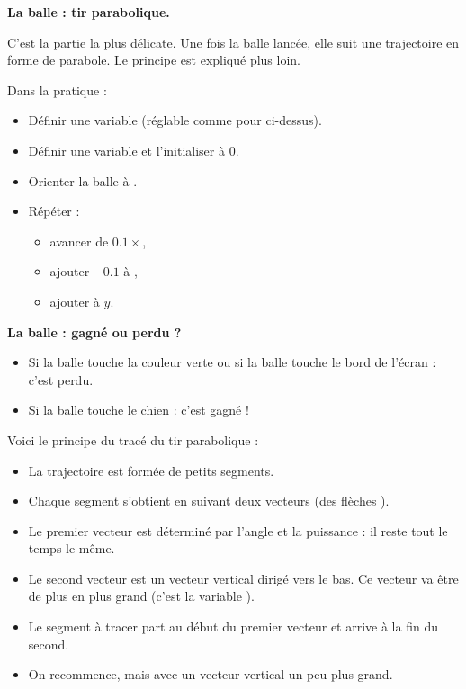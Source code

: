 \documentclass[class=report,crop=false, 12pt]{standalone}
\begin{document}
\begin{activite}
\bigskip
\textbf{La balle : tir parabolique.}

C'est la partie la plus délicate. Une fois la balle lancée, elle suit une trajectoire en forme de parabole. Le principe est expliqué plus loin.

Dans la pratique :
\begin{itemize}
  \item Définir une variable  (réglable comme pour  ci-dessus).

  \item Définir une variable  et l'initialiser à $0$.
  
  \item Orienter la balle à .
  
  \item Répéter :
  \begin{itemize}
    \item avancer de $0.1 \times$,
    
    \item ajouter $-0.1$ à ,
    
    \item ajouter  à $y$.
    
  \end{itemize}
\end{itemize}


\bigskip
\textbf{La balle : gagné ou perdu ?}

\begin{itemize}
  \item Si la balle touche la couleur verte ou si la balle touche le bord de l'écran : c'est perdu.
  \item Si la balle touche le chien : c'est gagné !
\end{itemize}


\bigskip

Voici le principe du tracé du tir parabolique : 
\begin{itemize}
  \item La trajectoire est formée de petits segments.
  \item Chaque segment s'obtient en suivant deux vecteurs (des \og flèches \fg{}).
  \item Le premier vecteur est déterminé par l'angle et la puissance : il reste tout le temps le même.
  \item Le second vecteur est un vecteur vertical dirigé vers le bas. Ce vecteur va être de plus en plus grand (c'est la variable ).
  \item Le segment à tracer part au début du premier vecteur et arrive à la fin du second.
  \item On recommence, mais avec un vecteur vertical un peu plus grand.
\end{itemize}  




\end{activite}
\end{document}
